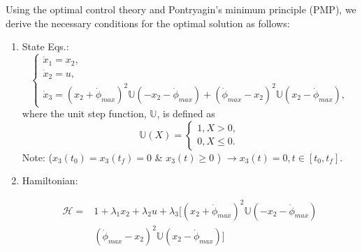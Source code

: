 \documentclass[letterpaper, paper,12pt]{AAS}		%
\begin{document}
	
	Using the optimal control theory and Pontryagin's minimum principle (PMP), we derive the necessary conditions for the optimal solution as follows:
	\begin{enumerate}
		\item State Eqs.:
		\begin{equation}
		\left\{
		\begin{array}{l}
		\dot{x}_1=x_2, \\
		\dot{x}_2=u, \\
		\dot{x}_3=(x_2+\dot{\phi}_{max})^2\mathbb{U}(-x_2-\dot{\phi}_{max})+(\dot{\phi}_{max}-x_2)^2\mathbb{U}(x_2-\dot{\phi}_{max}),
		\end{array}
		\right.
		\end{equation}
		where the unit step function, $\mathbb{U}$, is defined as
		\begin{equation}
		\mathbb{U}(X)=\left\{
		\begin{array}{l}
		1,   X>0, \\
		0,   X\leq 0.
		\end{array}
		\right.
		\end{equation}
		Note:  ($x_3(t_0)=x_3(t_f)=0$ \& $x_3(t)\geq 0$ ) $\rightarrow x_3(t)=0, t\in[t_0, t_f]$. 
		
		\item Hamiltonian:
		
		\begin{equation}
		\begin{split}
		\mathscr{H}=& 1+\lambda_1x_2+\lambda_2u+\lambda_3\Big[(x_2+\dot{\phi}_{max})^2\mathbb{U}(-x_2-\dot{\phi}_{max})\\
		& (\dot{\phi}_{max}-x_2)^2\mathbb{U}(x_2-\dot{\phi}_{max})\Big]
		\end{split}
		\end{equation}
		
		

\end{enumerate}
\end{document}
